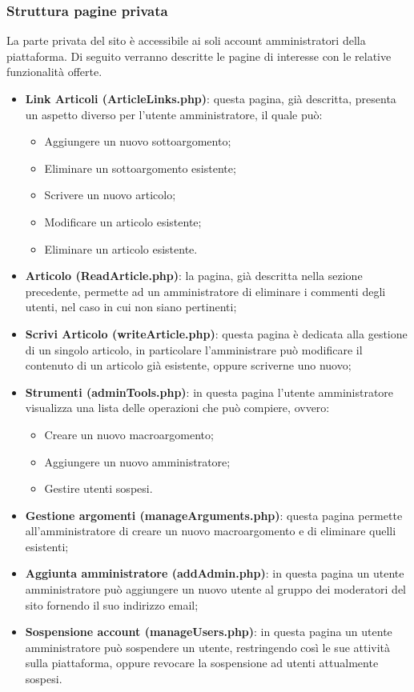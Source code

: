 \documentclass[12pt]{article}
\begin{document}
	\subsubsection{Struttura pagine privata}
	La parte privata del sito è accessibile ai soli account amministratori della piattaforma. Di seguito verranno descritte le pagine di interesse con le relative funzionalità offerte.
	\begin{itemize}
		\item \textbf{Link Articoli (ArticleLinks.php)}: questa pagina, già descritta, presenta un aspetto diverso per l'utente amministratore, il quale può:
		\begin{itemize}
			\item Aggiungere un nuovo sottoargomento;
			\item Eliminare un sottoargomento esistente;
			\item Scrivere un nuovo articolo;
			\item Modificare un articolo esistente;
			\item Eliminare un articolo esistente.
		\end{itemize}
		\item \textbf{Articolo (ReadArticle.php)}: la pagina, già descritta nella sezione precedente, permette ad un amministratore di eliminare i commenti degli utenti, nel caso in cui non siano pertinenti;
		\item \textbf{Scrivi Articolo (writeArticle.php)}: questa pagina è dedicata alla gestione di un singolo articolo, in particolare l'amministrare può modificare il contenuto di un articolo già esistente, oppure scriverne uno nuovo;
		\item \textbf{Strumenti (adminTools.php)}: in questa pagina l'utente amministratore visualizza una lista delle operazioni che può compiere, ovvero:
			\begin{itemize}
				\item Creare un nuovo macroargomento;
				\item Aggiungere un nuovo amministratore;
				\item Gestire utenti sospesi.
			\end{itemize}
		\item \textbf{Gestione argomenti (manageArguments.php)}: questa pagina permette all'amministratore di creare un nuovo macroargomento e di eliminare quelli esistenti;
		\item \textbf{Aggiunta amministratore (addAdmin.php)}: in questa pagina un utente amministratore può aggiungere un nuovo utente al gruppo dei moderatori del sito fornendo il suo indirizzo email;
		\item \textbf{Sospensione account (manageUsers.php)}: in questa pagina un utente amministratore può sospendere un utente, restringendo così le sue attività sulla piattaforma, oppure revocare la sospensione ad utenti attualmente sospesi.
	\end{itemize}
\end{document}
